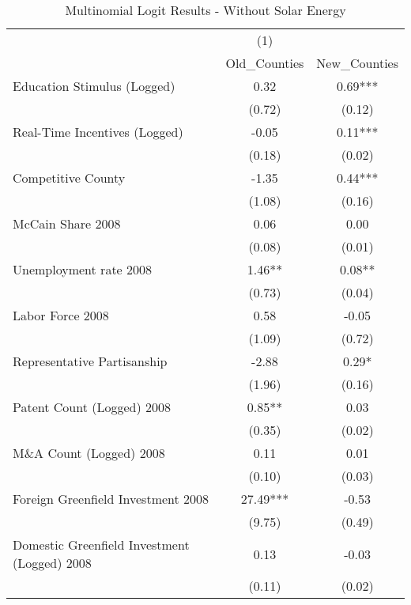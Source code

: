 \begin{table}[!htbp]\centering
\def\sym#1{\ifmmode^{#1}\else\(^{#1}\)\fi}
\caption{Multinomial Logit Results - Without Solar Energy}
\begin{tabular}{l*{2}{c}}
\hline\hline
                    &         (1)   &               \\
                    &Old_Counties   &New_Counties   \\
\hline
Education Stimulus (Logged)&        0.32   &        0.69***\\
                    &      (0.72)   &      (0.12)   \\
Real-Time Incentives (Logged)&       -0.05   &        0.11***\\
                    &      (0.18)   &      (0.02)   \\
Competitive County  &       -1.35   &        0.44***\\
                    &      (1.08)   &      (0.16)   \\
McCain Share 2008   &        0.06   &        0.00   \\
                    &      (0.08)   &      (0.01)   \\
Unemployment rate 2008&        1.46** &        0.08** \\
                    &      (0.73)   &      (0.04)   \\
Labor Force 2008    &        0.58   &       -0.05   \\
                    &      (1.09)   &      (0.72)   \\
Representative Partisanship&       -2.88   &        0.29*  \\
                    &      (1.96)   &      (0.16)   \\
Patent Count (Logged) 2008&        0.85** &        0.03   \\
                    &      (0.35)   &      (0.02)   \\
M\&A Count (Logged) 2008&        0.11   &        0.01   \\
                    &      (0.10)   &      (0.03)   \\
Foreign Greenfield Investment 2008&       27.49***&       -0.53   \\
                    &      (9.75)   &      (0.49)   \\
Domestic Greenfield Investment (Logged) 2008&        0.13   &       -0.03   \\
                    &      (0.11)   &      (0.02)   \\

\end{tabular}
\end{table}
